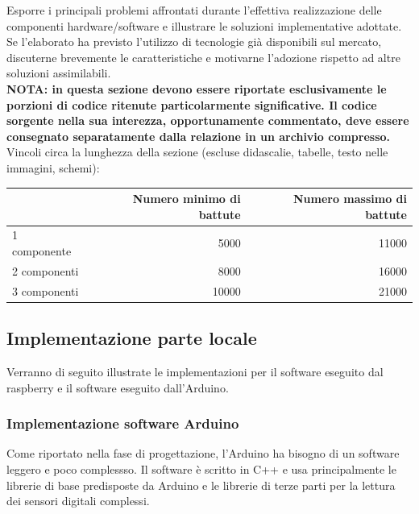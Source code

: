 \documentclass[12pt]{article}
\begin{document}
Esporre i principali problemi affrontati durante l'effettiva realizzazione delle componenti hardware/software e illustrare le soluzioni implementative adottate. Se l'elaborato ha previsto l'utilizzo di tecnologie già disponibili sul mercato, discuterne brevemente le caratteristiche e motivarne l'adozione rispetto ad altre soluzioni assimilabili.\\

\textbf{NOTA: in questa sezione devono essere riportate esclusivamente le porzioni di codice ritenute particolarmente significative. Il codice sorgente nella sua interezza, opportunamente commentato, deve essere consegnato separatamente dalla relazione in un archivio compresso.}\\


Vincoli circa la lunghezza della sezione (escluse didascalie, tabelle, testo nelle immagini, schemi):

\vspace{1cm}
\begin{tabular}{l|rr}
 & Numero minimo di battute & Numero massimo di battute \\
 \hline
 1 componente & 5000 & 11000 \\
 2 componenti & 8000 & 16000 \\
 3 componenti & 10000 & 21000 \\
 \hline
\end{tabular}
\newpage
\subsection{Implementazione parte locale}
Verranno di seguito illustrate le implementazioni per il software eseguito dal raspberry e il software eseguito dall'Arduino.
\subsubsection{Implementazione software Arduino}
Come riportato nella fase di progettazione, l'Arduino ha bisogno di un software leggero e poco complessso. Il software è scritto in C++ e usa principalmente le librerie di base predisposte da Arduino e le librerie di terze parti per la lettura dei sensori digitali complessi.
\end{document}
